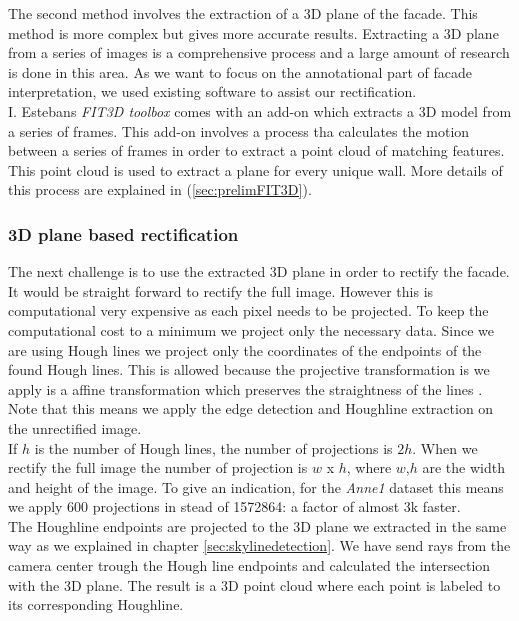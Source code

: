 The second method involves the extraction of a 3D plane of the facade.  This
method is more complex but gives more accurate results.  Extracting a 3D plane
from a series of images is a comprehensive process and a large amount of
research is done in this area.  As we want to focus on the annotational part of
facade interpretation, we used existing software to assist our rectification.\\

I. Estebans \emph{FIT3D toolbox} \cite{FIT3D} comes with an add-on which
extracts a 3D model from a series of frames.  This add-on involves a process tha
calculates the motion between a series of frames in order to extract a point
cloud of matching features. This point cloud is used to extract a plane for
every unique wall.  More details of this process are explained in
(\ref{sec:prelimFIT3D}).


\subsubsection{3D plane based rectification} 
The next challenge is to use the extracted 3D plane in order to rectify the facade.
It would be straight forward to rectify the full image. However this is
computational very expensive as each pixel needs to be projected. To keep the
computational cost to a minimum we project only the necessary data. Since we
are using Hough lines we project only the coordinates of the endpoints of the found Hough lines. 
This is allowed because the projective transformation is we apply is a affine
transformation which preserves the
straightness of the lines \cite{linearalgebra}. Note that this means we apply the edge detection and
Houghline extraction on the unrectified image.\\

If $h$ is the number of Hough lines, the number of projections is $2h$.
When we rectify the full image the number of projection is $w$ x $h$, where $w$,$h$ are the width and height of
the image. To give an indication, for the \emph{Anne1} dataset 
this means we apply 600 projections in stead of 1572864: a factor of almost 3k faster.\\

The Houghline endpoints are projected to the 3D plane we extracted in the same
way as we explained in chapter \ref{sec:skylinedetection}. We have send
rays from the camera center trough the Hough line endpoints and calculated the
intersection with the 3D plane.  The result is a 3D point cloud where each
point is labeled to its corresponding Houghline.\\

